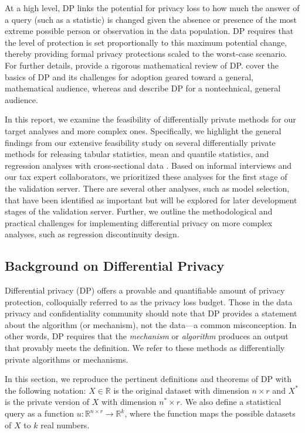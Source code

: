 At a high level, DP links the potential for privacy loss to how much the answer of a query (such as a statistic) is changed given the absence or presence of the most extreme possible person or observation in the data population. DP requires that the level of protection is set proportionally to this maximum potential change, thereby providing formal privacy protections scaled to the worst-case scenario. For further details, \citet{dwork2014algorithmic} provide a rigorous mathematical review of DP. \citet{bowen2021philosophy} cover the basics of DP and its challenges for adoption geared toward a general, mathematical audience, whereas \citet{nissim2017differential} and \citet{snoke2019differential} describe DP for a nontechnical, general audience. 

In this report, we examine the feasibility of differentially private methods for our target analyses and more complex ones. Specifically, we highlight the general findings from our extensive feasibility study on several differentially private methods for releasing tabular statistics, mean and quantile statistics, and regression analyses with cross-sectional data \citep{barrientos2021}. Based on informal interviews and our tax expert collaborators, we prioritized these analyses for the first stage of the validation server. There are several other analyses, such as model selection, that have been identified as important but will be explored for later development stages of the validation server. Further, we outline the methodological and practical challenges for implementing differential privacy on more complex analyses, such as regression discontinuity design.

\subsection{Background on Differential Privacy}\label{subsec:dp}
Differential privacy (DP) offers a provable and quantifiable amount of privacy protection, colloquially referred to as the privacy loss budget. Those in the data privacy and confidentiality community should note that DP provides a statement about the algorithm (or mechanism), not the data---a common misconception. In other words, DP requires that the \textit{mechanism} or \textit{algorithm} produces an output that provably meets the definition. We refer to these methods as differentially private algorithms or mechanisms.

In this section, we reproduce the pertinent definitions and theorems of DP with the following notation: $X\in\mathbb{R}$ is the original dataset  with dimension ${n\times r}$ and $X^*$ is the private version of $X$ with dimension ${n^*\times r}$. We also define a statistical query as a function $u:\mathbb{R}^{n\times r}\rightarrow\mathbb{R}^k$, where the function maps the possible datasets of $X$ to $k$ real numbers.

